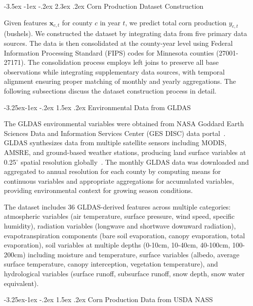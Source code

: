\documentclass[10pt,twocolumn]{article}
\makeatletter
\renewcommand{\vec}[1]{\mathbold{#1}}
\renewcommand\section{\@startsection{section}{1}{\z@}%
  {-3.5ex \@plus -1ex \@minus -.2ex}%
  {2.3ex \@plus.2ex}%
  {\normalfont\large\bfseries}}
\renewcommand\subsection{\@startsection{subsection}{2}{\z@}%
  {-3.25ex\@plus -1ex \@minus -.2ex}%
  {1.5ex \@plus .2ex}%
  {\normalfont\normalsize\bfseries}}
\makeatother
\begin{document}
\section{Corn Production Dataset Construction}

Given features \(\vec{x}_{c,t}\) for county \(c\) in year \(t\), we predict total corn production \(y_{c,t}\) (bushels).
We constructed the dataset by integrating data from five primary data sources.
The data is then consolidated at the county-year level using Federal Information Processing Standard (FIPS) codes for Minnesota counties (27001-27171).
The consolidation process employs left joins to preserve all base observations while integrating supplementary data sources, with temporal alignment ensuring proper matching of monthly and yearly aggregations.
The following subsections discuss the dataset construction process in detail.

\subsection{Environmental Data from GLDAS}

The GLDAS environmental variables were obtained from NASA Goddard Earth Sciences Data and Information Services Center (GES DISC) data portal~\cite{nasa}.
GLDAS synthesizes data from multiple satellite sensors including MODIS, AMSRE, and ground-based weather stations, producing land surface variables at 0.25$^{\circ}$ spatial resolution globally~\cite{rodell2004global}.
The monthly GLDAS data was downloaded and aggregated to annual resolution for each county by computing means for continuous variables and appropriate aggregations for accumulated variables, providing environmental context for growing season conditions.

The dataset includes 36 GLDAS-derived features across multiple categories: atmospheric variables (air temperature, surface pressure, wind speed, specific humidity), radiation variables (longwave and shortwave downward radiation), evapotranspiration components (bare soil evaporation, canopy evaporation, total evaporation), soil variables at multiple depths (0-10cm, 10-40cm, 40-100cm, 100-200cm) including moisture and temperature, surface variables (albedo, average surface temperature, canopy interception, vegetation temperature), and hydrological variables (surface runoff, subsurface runoff, snow depth, snow water equivalent).

\subsection{Corn Production Data from USDA NASS}
\end{document}
